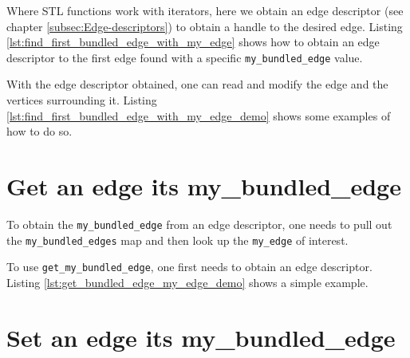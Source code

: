 Where STL functions work with iterators, here we obtain an edge descriptor
(see chapter \ref{subsec:Edge-descriptors}) 
to obtain a handle to the desired edge.
Listing \ref{lst:find_first_bundled_edge_with_my_edge}
shows how to obtain an edge descriptor to the first edge found with a specific
\verb;my_bundled_edge; value.



With the edge descriptor obtained, one can read and modify the edge and
the vertices surrounding it.
Listing \ref{lst:find_first_bundled_edge_with_my_edge_demo}
shows some examples of how to do so.



\section{Get an edge its my\_bundled\_edge}
\label{subsec:get_bundled_edge_my_edge}

To obtain the \verb;my_bundled_edge; from an edge descriptor, 
one needs to pull out the \verb;my_bundled_edges; map 
and then look up the \verb;my_edge; of interest.



To use \verb;get_my_bundled_edge;, 
one first needs to obtain an edge descriptor.
Listing \ref{lst:get_bundled_edge_my_edge_demo} shows a simple example.



\section{Set an edge its my\_bundled\_edge}
\label{subsec:set_bundled_edge_my_edge}

